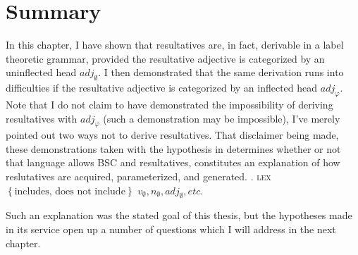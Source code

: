 \documentclass[MilwayThesis]{subfiles}
\begin{document}
\section{Summary}
In this chapter, I have shown that resultatives are, in fact, derivable in a label theoretic grammar, provided the resultative adjective is categorized by an uninflected head $adj_\emptyset$.
I then demonstrated that the same derivation runs into difficulties if the resultative adjective is categorized by an inflected head $adj_\varphi$.
Note that I do not claim to have demonstrated the impossibility of deriving resultatives with $adj_\varphi$ (such a demonstration may be impossible), I've merely pointed out two ways not to derive resultatives.
That disclaimer being made, these demonstrations taken with the hypothesis in \Next determines whether or not that language allows BSC and resultatives, constitutes an explanation of how reslutatives are acquired, parameterized, and generated.
\ex. \textsc{lex} $\left\{ \text{includes, does not include} \right\}$ $v_\emptyset, n_\emptyset, adj_\emptyset, etc.$

Such an explanation was the stated goal of this thesis, but the hypotheses made in its service open up a number of questions which I will address in the next chapter.
\end{document}
